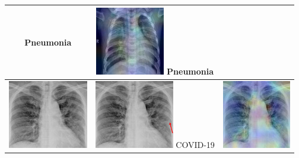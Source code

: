 \begin{longtable} { | c | c | c | }
\begin{minipage}{.3\textwidth}
           \centering  Pneumonia
               \vspace{0.5em}
    \end{minipage}
    & 
    \begin{minipage}{.3\textwidth}
        \vspace{1em}
      \includegraphics[width=\linewidth, height=30mm]{Images/PneuHeatmap3.jpg}
      \centering Pneumonia
          \vspace{0.5em}
    \end{minipage}
    \\ \hline
          \begin{minipage}{.3\textwidth}
    \vspace{1em}
      \includegraphics[width=\linewidth, height=30mm]{Images/covidOrig1.jpg}
    \vspace{0.5em}
    \end{minipage}
    &
  \begin{minipage}{.3\textwidth}
      \vspace{1em}
      \includegraphics[width=\linewidth, height=30mm]{Images/covidRadio1.png}
           \centering  COVID-19
               \vspace{0.5em}
    \end{minipage}
    & 
    \begin{minipage}{.3\textwidth}
        \vspace{1em}
      \includegraphics[width=\linewidth, height=30mm]{Images/covidHeatmap1.jpg}

\end{minipage}
\end{longtable}
